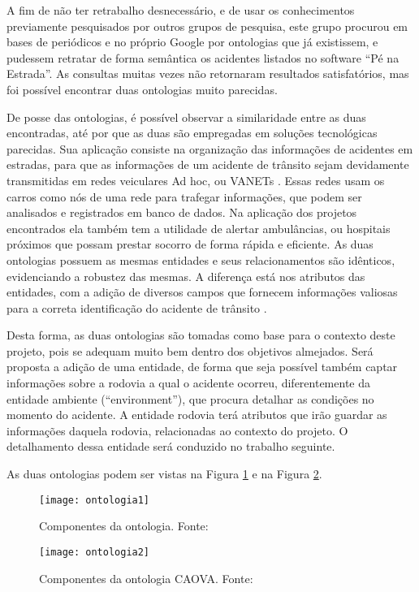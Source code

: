   A fim de não ter retrabalho desnecessário, e de usar os conhecimentos previamente
  pesquisados por outros grupos de pesquisa, este grupo procurou em bases de periódicos e no
  próprio Google por ontologias que já existissem, e pudessem retratar de forma semântica os
  acidentes listados no software “Pé na Estrada”. As consultas muitas vezes não retornaram
  resultados satisfatórios, mas foi possível encontrar duas ontologias muito parecidas.
  
  De posse das ontologias, é possível observar a similaridade entre as duas encontradas,
  até por que as duas são empregadas em soluções tecnológicas parecidas. Sua aplicação
  consiste na organização das informações de acidentes em estradas, para que as informações de
  um acidente de trânsito sejam devidamente transmitidas em redes veiculares Ad hoc, ou
  VANETs \cite{barrachina12}. Essas redes usam os carros como nós de uma rede para
  trafegar informações, que podem ser analisados e registrados em banco de dados. Na
  aplicação dos projetos encontrados ela também tem a utilidade de alertar ambulâncias, ou
  hospitais próximos que possam prestar socorro de forma rápida e eficiente. As duas
  ontologias possuem as mesmas entidades e seus relacionamentos são idênticos, evidenciando
  a robustez das mesmas. A diferença está nos atributos das entidades, com a adição de diversos
  campos que fornecem informações valiosas para a correta identificação do acidente de
  trânsito \cite{villalba14}.
  
  Desta forma, as duas ontologias são tomadas como base para o contexto deste projeto,
  pois se adequam muito bem dentro dos objetivos almejados. Será proposta a adição de uma
  entidade, de forma que seja possível também captar informações sobre a rodovia a qual o
  acidente ocorreu, diferentemente da entidade ambiente (“environment”), que procura detalhar
  as condições no momento do acidente. A entidade rodovia terá atributos que irão guardar as
  informações daquela rodovia, relacionadas ao contexto do projeto. O detalhamento dessa
  entidade será conduzido no trabalho seguinte.
  
  As duas ontologias podem ser vistas na Figura \ref{fig:ontologia1} e na Figura \ref{fig:ontologia2}.
  
  \begin{figure}[!htb]
    \centering
    \texttt{[image: ontologia1]}
    \caption[Componentes da ontologia]{Componentes da ontologia. Fonte: \cite{villalba14}}
    \label{fig:ontologia1}
  \end{figure}
  
    \begin{figure}[!htb]
    \centering
    \texttt{[image: ontologia2]}
    \caption[Componentes da ontologia CAOVA]{Componentes da ontologia CAOVA. Fonte: \cite{barrachina12}}
    \label{fig:ontologia2}
  \end{figure}